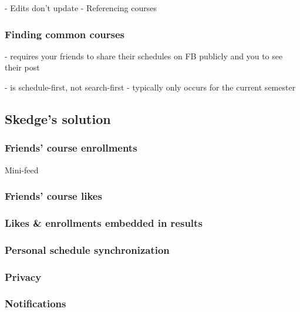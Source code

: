   - Edits don’t update
  - Referencing courses

  \subsubsection{Finding common courses}

  - requires your friends to share their schedules on FB publicly and you to see their post




  - is schedule-first, not search-first
  - typically only occurs for the current semester


\subsection{Skedge's solution}


  \subsubsection{Friends' course enrollments}

  Mini-feed

  \subsubsection{Friends' course likes}

  \subsubsection{Likes \& enrollments embedded in results}

  \subsubsection{Personal schedule synchronization}

  \subsubsection{Privacy}

  \subsubsection{Notifications}

